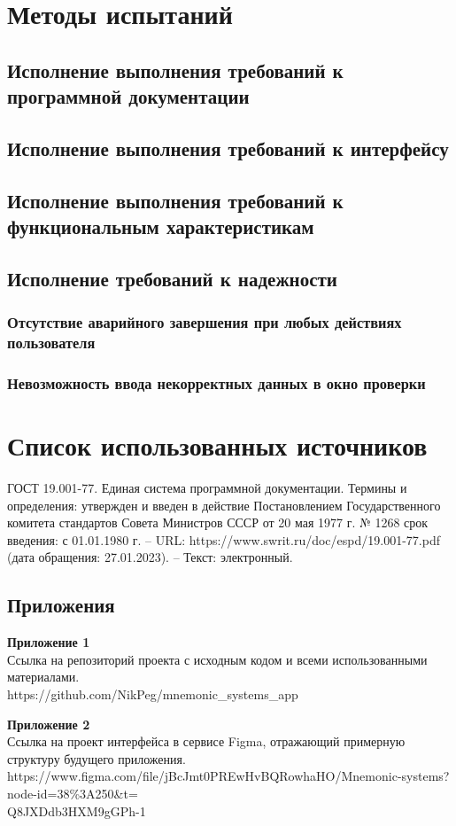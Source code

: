 \documentclass[draft]{article}
\newcommand\zz[1]{\par{\normalsize\strut #1} \hfill\ignorespaces}
\begin{document}
\section {Методы испытаний}
\subsection{Исполнение выполнения требований к программной документации}
\subsection{Исполнение выполнения требований к интерфейсу}
\subsection{Исполнение выполнения требований к функциональным характеристикам}
\subsection{Исполнение требований к надежности}
\subsubsection{Отсутствие аварийного завершения при любых действиях пользователя}
\subsubsection{Невозможность ввода некорректных данных в окно проверки}
\newpage
{}
\section*{Список использованных источников}
\begin{thebibliography}{}
 ГОСТ 19.001-77. Единая система программной документации. Термины и определения: утвержден и введен в действие Постановлением Государственного комитета стандартов Совета Министров СССР от 20 мая 1977 г. № 1268 срок введения: с 01.01.1980 г. – URL: https://www.swrit.ru/doc/espd/19.001-77.pdf (дата обращения: 27.01.2023). – Текст: электронный.
\end{thebibliography}
\newpage
\begin{center}
\section*{Приложения}
\end{center}
\zz{}\textbf{Приложение 1\\}
Ссылка на репозиторий проекта с исходным кодом и всеми использованными материалами.\\
https://github.com/NikPeg/mnemonic\_systems\_app\\
\zz{}\textbf{Приложение 2\\}
Ссылка на проект интерфейса в сервисе Figma, отражающий примерную структуру будущего приложения.\\
https://www.figma.com/file/jBcJmt0PREwHvBQRowhaHO/Mnemonic-systems?node-id=38\%3A250\&t=\\
Q8JXDdb3HXM9gGPh-1\\
\end{document}
